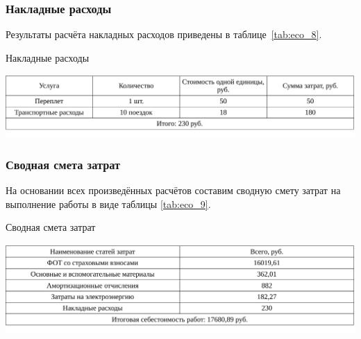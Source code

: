\subsubsection{Накладные расходы}

Результаты расчёта накладных расходов приведены в таблице~\ref{tab:eco_8}.

\begin{table}[!ht]
\caption{Накладные расходы}
\centering
\includegraphics[page=1, width=1\linewidth]{tables/economics/econom_3.pdf}
\label{tab:eco_8}
\end{table}


\subsubsection{Сводная смета затрат}

На основании всех произведённых расчётов составим сводную смету затрат на выполнение работы в виде таблицы \ref{tab:eco_9}.

\begin{table}[!ht]
\caption{Сводная смета затрат}
\centering
\includegraphics[page=1, width=1\linewidth]{tables/economics/econom_4.pdf}
\label{tab:eco_9}
\end{table}


% 
% 
% 
% 
% 

